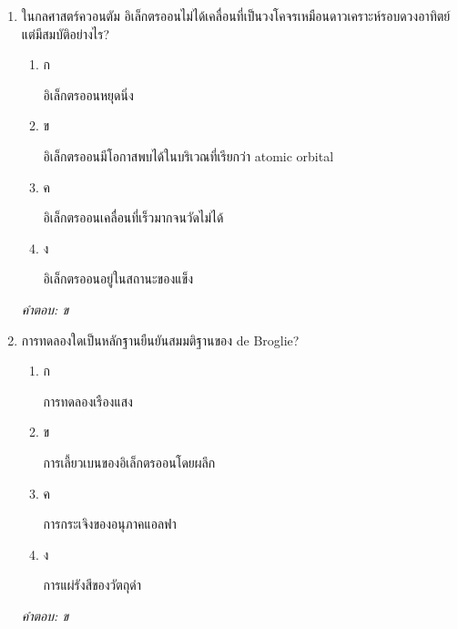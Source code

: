\documentclass[12pt]{article}
\begin{document}
\begin{enumerate}[label=\arabic*., itemsep=0.5\baselineskip, topsep=0.5\baselineskip, leftmargin=*]
\item ในกลศาสตร์ควอนตัม อิเล็กตรออนไม่ได้เคลื่อนที่เป็นวงโคจรเหมือนดาวเคราะห์รอบดวงอาทิตย์ แต่มีสมบัติอย่างไร?
\begin{enumerate}[label=\alph*)., itemsep=0.3\baselineskip, topsep=0.3\baselineskip]
\item ก\ 
\begin{minipage}[t]{0.9\linewidth}
\raggedright อิเล็กตรออนหยุดนิ่ง
\end{minipage}
\item ข\ 
\begin{minipage}[t]{0.9\linewidth}
\raggedright อิเล็กตรออนมีโอกาสพบได้ในบริเวณที่เรียกว่า atomic orbital
\end{minipage}
\item ค\ 
\begin{minipage}[t]{0.9\linewidth}
\raggedright อิเล็กตรออนเคลื่อนที่เร็วมากจนวัดไม่ได้
\end{minipage}
\item ง\ 
\begin{minipage}[t]{0.9\linewidth}
\raggedright อิเล็กตรออนอยู่ในสถานะของแข็ง
\end{minipage}
\end{enumerate}
\vspace{-0.3\baselineskip}
\begin{small}
\textit{คำตอบ: ข}
\end{small}

\item การทดลองใดเป็นหลักฐานยืนยันสมมติฐานของ de Broglie?
\begin{enumerate}[label=\alph*)., itemsep=0.3\baselineskip, topsep=0.3\baselineskip]
\item ก\ 
\begin{minipage}[t]{0.9\linewidth}
\raggedright การทดลองเรืองแสง
\end{minipage}
\item ข\ 
\begin{minipage}[t]{0.9\linewidth}
\raggedright การเลี้ยวเบนของอิเล็กตรออนโดยผลึก
\end{minipage}
\item ค\ 
\begin{minipage}[t]{0.9\linewidth}
\raggedright การกระเจิงของอนุภาคแอลฟา
\end{minipage}
\item ง\ 
\begin{minipage}[t]{0.9\linewidth}
\raggedright การแผ่รังสีของวัตถุดำ
\end{minipage}
\end{enumerate}
\vspace{-0.3\baselineskip}
\begin{small}
\textit{คำตอบ: ข}
\end{small}


\end{enumerate}
\end{document}
